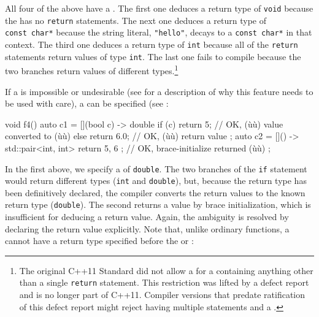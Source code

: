 All four of the above  have a . The first one deduces a return type of \lstinline!void!
because the  has no \lstinline!return! statements. The
next one deduces a return type of \lstinline!const!~\lstinline!char*! because
the string literal, \lstinline!"hello"!, decays to a
\lstinline!const!~\lstinline!char*! in that context. The third one deduces a
return type of \lstinline!int! because all of the \lstinline!return!
statements return values of type \lstinline!int!. The last one fails to
compile because the two branches return values of different
types.{\cprotect\footnote{The original C++11 Standard did not allow a
 for a  containing
anything other than a single \lstinline!return! statement. This
restriction was lifted by a defect report and is no longer part of
C++11. Compiler versions that predate ratification of this defect
report might reject  having multiple
  statements and a .}}

If a  is impossible or undesirable (see
 for a description of why this feature
needs to be used with care), a  can be
specified (see :

\begin{emcppslisting}
void f4()
{
    auto c1 = [](bool c) -> double {
        if (c) { return 5; }          // OK, (ù{}ù) value converted to (ù{}ù)
        else   { return 6.0; }        // OK, (ù{}ù) return value
    };
    auto c2 = []() -> std::pair<int, int> {
        return { 5, 6 };              // OK, brace-initialize returned (ù{}ù)
    };
}
\end{emcppslisting}
    

In the first  above, we specify a
 of \lstinline!double!. The two branches of
the \lstinline!if! statement would return different types (\lstinline!int! and
\lstinline!double!), but, because the return type has been definitively
declared, the compiler converts the return values to the known return
type (\lstinline!double!). The second  returns a
value by brace initialization, which is insufficient for deducing a
return value. Again, the ambiguity is resolved by declaring the return
value explicitly. Note that, unlike ordinary functions, a  cannot have a return type specified before the
 or :

